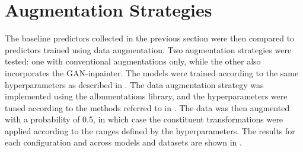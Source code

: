 \section{Augmentation Strategies}\label{augmentations}
The baseline predictors collected in the previous section were then compared to predictors trained using data augmentation. Two augmentation strategies were tested: one with conventional augmentations only, while the other also incorporates the GAN-inpainter. The models were trained according to the same hyperparameters as described in . The data augmentation strategy was implemented using the albumentations library, and the hyperparameters were tuned according to the methods referred to in . The data was then augmented with a probability of 0.5, in which case the constituent transformations were applied according to the ranges defined by the hyperparameters. The results for each configuration and across models and datasets are shown in .

